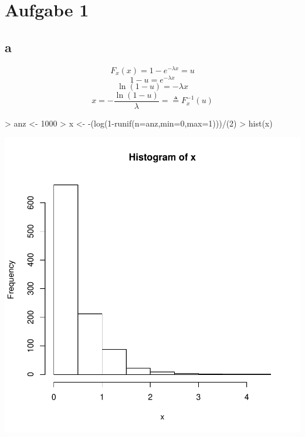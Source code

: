 

\section{Aufgabe 1}

\subsection{a}
\[ F_x(x) = 1 - e^{-\lambda x} = u \]
\[ 1 - u = e^{-\lambda x} \]
\[ \ln(1-u) = -\lambda x \]
\[ x = -\frac{\ln(1-u)}{\lambda} = \triangleq F_x^{-1}(u) \]
\begin{Schunk}
\begin{Sinput}
> anz <- 1000
> x <- -(log(1-runif(n=anz,min=0,max=1)))/(2)
> hist(x)
\end{Sinput}
\end{Schunk}
\includegraphics{sw08_1-001}

